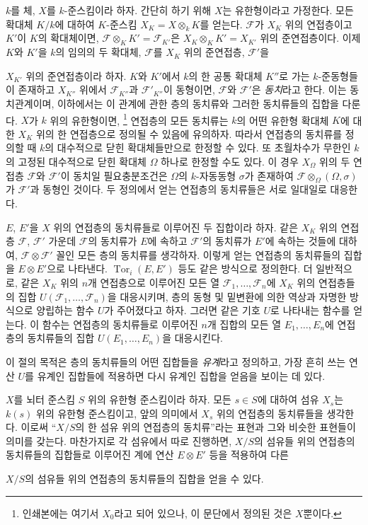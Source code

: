 \documentclass[11pt,twoside,openany]{book}
\numberwithin{equation}{section}
\newcommand{\sourceunit}{front}
\newcommand{\src}[1]{%
  \phantomsection\hypertarget{src:\sourceunit:#1}{}%
  \marginpar{\raggedleft\footnotesize\sffamily #1}%
}
\theoremstyle{plain}
\theoremstyle{definition}
\theoremstyle{remark}
\begin{document}
$k$를 체, $X$를 $k$-준스킴이라 하자. 간단히 하기 위해 $X$는 유한형이라고
가정한다. 모든 확대체 $K/k$에 대하여 $K$-준스킴
$X_K=X\otimes_k K$를 얻는다. $\mathcal F$가 $X_K$ 위의 연접층이고
$K'$이 $K$의 확대체이면,
$\mathcal F\otimes_K K'=\mathcal F_{K'}$은
$X_K\otimes_K K'=X_{K'}$ 위의 준연접층이다. 이제 $K$와 $K'$을 $k$의
임의의 두 확대체, $\mathcal F$를 $X_K$ 위의 준연접층, $\mathcal F'$을
\src{250}
$X_{K'}$ 위의 준연접층이라 하자. $K$와 $K'$에서 $k$의 한 공통 확대체
$K''$로 가는 $k$-준동형들이 존재하고 $X_{K''}$ 위에서
$\mathcal F_{K''}$과 $\mathcal F'_{K''}$이 동형이면, $\mathcal F$와
$\mathcal F'$은 \emph{동치}라고 한다. 이는 동치관계이며, 이하에서는 이
관계에 관한 층의 동치류와 그러한 동치류들의 집합을 다룬다. $X$가 $k$
위의 유한형이면,
\footnote{인쇄본에는 여기서 $X_0$라고 되어 있으나, 이 문단에서 정의된 것은
$X$뿐이다.} 연접층의 모든 동치류는 $k$의 어떤 유한형 확대체 $K$에 대한
$X_K$ 위의 한 연접층으로 정의될 수 있음에 유의하자. 따라서 연접층의
동치류를 정의할 때 $k$의 대수적으로 닫힌 확대체들만으로 한정할 수 있다.
또 초월차수가 무한인 $k$의 고정된 대수적으로 닫힌 확대체 $\Omega$ 하나로
한정할 수도 있다. 이 경우 $X_\Omega$ 위의 두 연접층 $\mathcal F$와
$\mathcal F'$이 동치일 필요충분조건은 $\Omega$의 $k$-자동동형
$\sigma$가 존재하여 $\mathcal F\otimes_\Omega(\Omega,\sigma)$가
$\mathcal F'$과 동형인 것이다. 두 정의에서 얻는 연접층의 동치류들은
서로 일대일로 대응한다.

$E$, $E'$을 $X$ 위의 연접층의 동치류들로 이루어진 두 집합이라 하자.
같은 $X_K$ 위의 연접층 $\mathcal F$, $\mathcal F'$ 가운데
$\mathcal F$의 동치류가 $E$에 속하고 $\mathcal F'$의 동치류가 $E'$에
속하는 것들에 대하여, $\mathcal F\otimes\mathcal F'$ 꼴인 모든 층의
동치류를 생각하자. 이렇게 얻는 연접층의 동치류들의 집합을
$E\otimes E'$으로 나타낸다. $\operatorname{Tor}_i(E,E')$ 등도 같은
방식으로 정의한다. 더 일반적으로, 같은 $X_K$ 위의 $n$개 연접층으로
이루어진 모든 열 $\mathcal F_1,\ldots,\mathcal F_n$에 $X_K$ 위의
연접층들의 집합 $U(\mathcal F_1,\ldots,\mathcal F_n)$을 대응시키며,
층의 동형 및 밑변환에 의한 역상과 자명한 방식으로 양립하는 함수 $U$가
주어졌다고 하자. 그러면 같은 기호 $U$로 나타내는 함수를 얻는다. 이 함수는
연접층의 동치류들로 이루어진 $n$개 집합의 모든 열
$E_1,\ldots,E_n$에 연접층의 동치류들의 집합
$U(E_1,\ldots,E_n)$을 대응시킨다.

이 절의 목적은 층의 동치류들의 어떤 집합들을 \emph{유계}라고 정의하고,
가장 흔히 쓰는 연산 $U$를 유계인 집합들에 적용하면 다시 유계인 집합을
얻음을 보이는 데 있다.

$X$를 뇌터 준스킴 $S$ 위의 유한형 준스킴이라 하자. 모든 $s\in S$에
대하여 섬유 $X_s$는 $k(s)$ 위의 유한형 준스킴이고, 앞의 의미에서
$X_s$ 위의 연접층의 동치류들을 생각한다. 이로써 ``$X/S$의 한 섬유 위의
연접층의 동치류''라는 표현과 그와 비슷한 표현들이 의미를 갖는다. 마찬가지로
각 섬유에서 따로 진행하면, $X/S$의 섬유들 위의 연접층의 동치류들의
집합들로 이루어진 계에 연산 $E\otimes E'$ 등을 적용하여 다른
\src{251}
$X/S$의 섬유들 위의 연접층의 동치류들의 집합을 얻을 수 있다.
\end{document}
